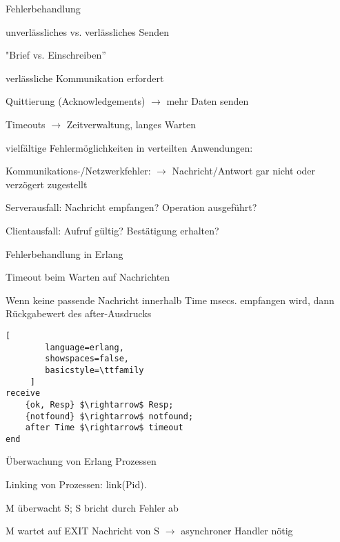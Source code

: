 \documentclass[10pt]{article}
\begin{document}
Fehlerbehandlung
\begin{itemize*}
  \item unverlässliches vs. verlässliches Senden
  \begin{itemize*}
    \item "Brief vs. Einschreiben”
  \end{itemize*}
  \item verlässliche Kommunikation erfordert
  \begin{itemize*}
    \item Quittierung (Acknowledgements) $\rightarrow$ mehr Daten senden
    \item Timeouts $\rightarrow$ Zeitverwaltung, langes Warten
  \end{itemize*}
  \item vielfältige Fehlermöglichkeiten in verteilten Anwendungen:
  \begin{itemize*}
    \item Kommunikations-/Netzwerkfehler: $\rightarrow$ Nachricht/Antwort gar nicht oder verzögert zugestellt
    \item Serverausfall: Nachricht empfangen? Operation ausgeführt?
    \item Clientausfall: Aufruf gültig? Bestätigung erhalten?
  \end{itemize*}
\end{itemize*}

Fehlerbehandlung in Erlang
\begin{itemize*}
  \item Timeout beim Warten auf Nachrichten
  \item Wenn keine passende Nachricht innerhalb Time msecs. empfangen wird, dann Rückgabewert des after-Ausdrucks
\end{itemize*}
\begin{lstlisting}[
        language=erlang,
        showspaces=false,
        basicstyle=\ttfamily
     ]
receive
    {ok, Resp} $\rightarrow$ Resp;
    {notfound} $\rightarrow$ notfound;
    after Time $\rightarrow$ timeout
end
\end{lstlisting}

Überwachung von Erlang Prozessen
\begin{itemize*}
  \item Linking von Prozessen: link(Pid).
  \item M überwacht S; S bricht durch Fehler ab
  \item M wartet auf EXIT Nachricht von S $\rightarrow$ asynchroner Handler nötig
\end{itemize*}
\end{document}
